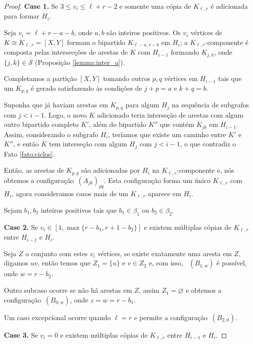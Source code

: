 \documentclass[11pt,twoside,a4paper]{book}
\newcommand{\K}{K_{\ell,r}} %
\theoremstyle{note}
\begin{document}
\begin{proof}
    
    \medskip \textbf{Case 1.}
	Se $3 \leq v_i \leq \ell+r-2$ e somente uma cópia de $\K$ é adicionada para formar $H_i$.
   
    Seja $v_i= \ell+r-a-b$, onde $a,b$ são inteiros positivos.  
    Os $v_i$ vértices de $K \cong \K= [X,Y]$ formam o bipartido $K_{\ell-a,r-b}$ em $H_i$; a $\K$-componente é
    composta pelas intersecções de arestas de $K$ com $H_{i-1}$ formando $K_{j,k}$,
    onde $\{j,k\} \in \mathcal{S}$ (Proposição \ref{lemma:inter_a}).  
   
   Completamos a partição $[X,Y]$ tomando outros $p,q$ vértices em $H_{i-1}$ tais que um $K_{p,q}$ é gerado satisfazendo às condições de  $j+p = a$ e $k+q = b$. 
   
   Suponha que já haviam arestas em $K_{p,q}$  para algum $H_j$ na sequência de subgrafos com $j < i-1$.
   Logo, o novo $K$ adicionado teria interseção de arestas com algum outro bipartido completo $K'$, além do bipartido $K''$ que contém $K_{jk}$ em $H_{i-1}$.
   Assim, considerando o subgrafo $H_{i}$, teríamos que existe um caminho entre $K'$ e $K''$, e então $K$ 
   tem interseção com algum $H_j$ com $j<i-1$, o que contradiz o Fato \ref{fato:ciclos}.
  
     Então, as arestas de $K_{p,q}$ são adicionadas por $H_i$ na $\K$-componente e, nós obtemos a configuração~\hyperref[configA]{$(A_{jk})_{pq}$}. 
    Esta configuração forma um único $\K$ com $H_i$,  agora consideramos casos mais de um $\K$ aparece em $H_i$.

    Sejam $b_1, b_2$ inteiros positivos tais que $b_1 \in \beta_1$ ou $b_2 \in \beta_2$.
    
     \medskip \textbf{Case 2.} 
    Se $v_i \in [1, \max\{r - b_1, r+1-b_2\}]$ e existem múltiplas cópias de $\K$ entre $H_{i-1}$ e $H_i$.
	
   Seja $Z$ o conjunto com estes $v_i$ vértices, 
   se existe exatamente uma aresta em $Z$, digamos $uv$, então temos que
    $Z_1 = \{u\}$ e $v \in Z_2$ e, com isso,
    ~\hyperref[configB]{$(B_{1,w})$} é possível, onde $w = r-b_2$.
        
        Outro subcaso ocorre se não há arestas em $Z$, assim $Z_1 =
    \varnothing$ e obtemos a configuração~\hyperref[configB]{$(B_{0,w})$}, 
    onde $z = w = r-b_1$.
    
    Um caso excepcional ocorre quando $\ell = r$ e permite a
configuração~\hyperref[configB]{$(B_{2,0})$}.
   
 \medskip \textbf{Case 3.} 
	  Se $v_i = 0$ e existem múltiplas cópias de $\K$ entre $H_{i-1}$ e $H_i$. 
	  

\end{proof}
\end{document}
